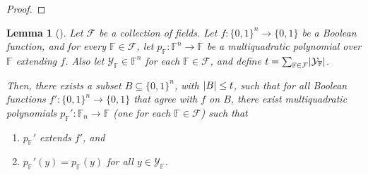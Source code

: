 \documentclass[english,12pt]{reedthesis}
\theoremstyle{plain}
\newtheorem{lemma}[lemma]{Lemma}
\theoremstyle{definition}
\theoremstyle{remark}
\DeclarePairedDelimiter{\abs}{\lvert}{\rvert}
\begin{document}
\begin{proof}
\end{proof}

\begin{lemma}[{\cite[Lemma 4.5]{AW09}}]\label{lem:multiquad-adversary}
  Let $\mathcal{F}$ be a collection of fields. Let $f\colon \{0, 1\}^{n} \rightarrow \{0, 1\}$ be a
  Boolean function, and for every $\mathbb{F} \in \mathcal{F}$, let
  $p_{\mathbb{F}}\colon \mathbb{F}^{n} \rightarrow \mathbb{F}$ be a multiquadratic
  polynomial over $\mathbb{F}$ extending $f$. Also let
  $\mathcal{Y}_{\mathbb{F}} \in \mathbb{F}^{n}$ for each $\mathbb{F} \in \mathcal{F}$, and define
  $t = \sum_{\mathbb{F} \in \mathcal{F}}\abs{\mathcal{Y}_{\mathbb{F}}}$.

  Then, there exists a subset $B \subseteq \{0, 1\}^{n}$, with $\abs{B} \le t$, such that
  for all Boolean functions $f'\colon \{0, 1\}^{n} \rightarrow \{0, 1\}$ that agree with
  $f$ on $B$, there exist multiquadratic polynomials
  $p_{\mathbb{F}}'\colon \mathbb{F}_{n} \rightarrow \mathbb{F}$ (one for each
  $\mathbb{F} \in \mathcal{F}$) such that
  \begin{enumerate}
    \item $p_{\mathbb{F}}'$ extends $f'$, and
    \item $p_{\mathbb{F}}'(y) = p_{\mathbb{F}}(y)$ for all $y \in \mathcal{Y}_{\mathbb{F}}$.
  \end{enumerate}
\end{lemma}
\end{document}
